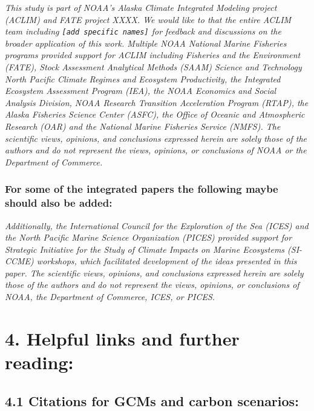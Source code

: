 \documentclass[
]{article}
\begin{document}
\emph{This study is part of NOAA's Alaska Climate Integrated Modeling
project (ACLIM) and FATE project XXXX. We would like to that the entire
ACLIM team including \texttt{{[}add\ specific\ names{]}} for feedback
and discussions on the broader application of this work. Multiple NOAA
National Marine Fisheries programs provided support for ACLIM including
Fisheries and the Environment (FATE), Stock Assessment Analytical
Methods (SAAM) Science and Technology North Pacific Climate Regimes and
Ecosystem Productivity, the Integrated Ecosystem Assessment Program
(IEA), the NOAA Economics and Social Analysis Division, NOAA Research
Transition Acceleration Program (RTAP), the Alaska Fisheries Science
Center (ASFC), the Office of Oceanic and Atmospheric Research (OAR) and
the National Marine Fisheries Service (NMFS). The scientific views,
opinions, and conclusions expressed herein are solely those of the
authors and do not represent the views, opinions, or conclusions of NOAA
or the Department of Commerce.}

\hypertarget{for-some-of-the-integrated-papers-the-following-maybe-should-also-be-added}{%
\subsubsection{For some of the integrated papers the following maybe
should also be
added:}\label{for-some-of-the-integrated-papers-the-following-maybe-should-also-be-added}}

\emph{Additionally, the International Council for the Exploration of the
Sea (ICES) and the North Pacific Marine Science Organization (PICES)
provided support for Strategic Initiative for the Study of Climate
Impacts on Marine Ecosystems (SI-CCME) workshops, which facilitated
development of the ideas presented in this paper. The scientific views,
opinions, and conclusions expressed herein are solely those of the
authors and do not represent the views, opinions, or conclusions of
NOAA, the Department of Commerce, ICES, or PICES.}

\hypertarget{helpful-links-and-further-reading}{%
\section{4. Helpful links and further
reading:}\label{helpful-links-and-further-reading}}

\hypertarget{citations-for-gcms-and-carbon-scenarios}{%
\subsection{4.1 Citations for GCMs and carbon
scenarios:}\label{citations-for-gcms-and-carbon-scenarios}}
\end{document}
